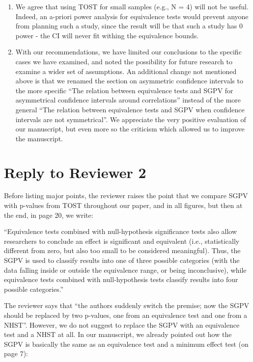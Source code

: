 \documentclass[man]{apa6}
\begin{document}
\begin{enumerate}
\item
  We agree that using TOST for small samples (e.g., N = 4) will not be useful. Indeed, an a-priori power analysis for equivalence tests would prevent anyone from planning such a study, since the result will be that such a study has 0 power - the CI will never fit withing the equivalence bounds.
\item
  With our recommendations, we have limited our conclusions to the specific cases we have examined, and noted the possibility for future research to examine a wider set of assumptions. An additional change not mentioned above is that we renamed the section on asymmetric confidence intervals to the more specific \enquote{The relation between equivalence tests and SGPV for asymmetrical confidence intervals around correlations} instead of the more general \enquote{The relation between equivalence tests and SGPV when confidence intervals are not symmetrical}. We appreciate the very positive evaluation of our manuscript, but even more so the criticism which allowed us to improve the manuscript.
\end{enumerate}

\hypertarget{reply-to-reviewer-2}{%
\section{Reply to Reviewer 2}\label{reply-to-reviewer-2}}

Before listing major points, the reviewer raises the point that we compare SGPV with p-values from TOST throughout our paper, and in all figures, but then at the end, in page 20, we write:

\enquote{Equivalence tests combined with null-hypothesis significance tests also allow researchers to conclude an effect is significant and equivalent (i.e., statistically different from zero, but also too small to be considered meaningful). Thus, the SGPV is used to classify results into one of three possible categories (with the data falling inside or outside the equivalence range, or being inconclusive), while equivalence tests combined with null-hypothesis tests classify results into four possible categories.}

The reviewer says that \enquote{the authors suddenly switch the premise; now the SGPV should be replaced by two p-values, one from an equivalence test and one from a NHST}. However, we do not suggest to replace the SGPV with an equivalence test and a NHST at all. In our manuscript, we already pointed out how the SGPV is basically the same as an equivalence test and a minimum effect test (on page 7):
\end{document}
